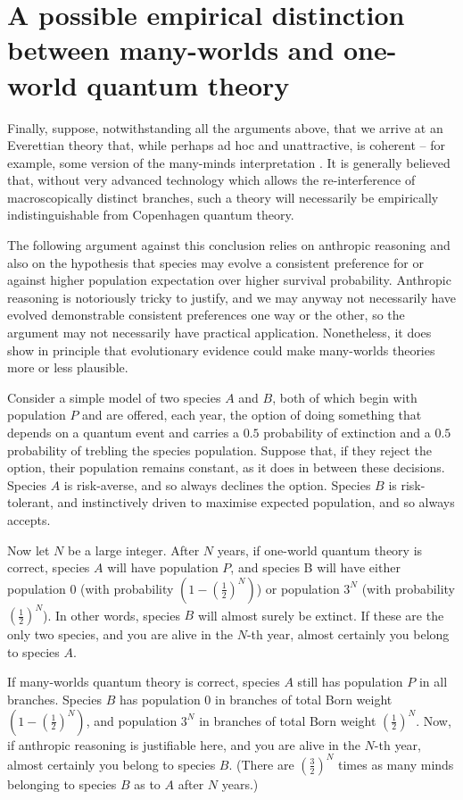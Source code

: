 \documentclass[aps,
pra,epsfig,12pt]{revtex4}
\begin{document}
\section{A possible empirical distinction between many-worlds and one-world
quantum theory}

Finally, suppose, notwithstanding all the arguments above, 
that we arrive at an Everettian theory that, while perhaps 
ad hoc and unattractive, is coherent -- for example, some version of 
the many-minds interpretation \cite{almanyminds}.  
It is generally believed that, without very advanced technology which
allows the re-interference of macroscopically distinct branches, 
such a theory will necessarily be empirically indistinguishable from Copenhagen 
quantum theory.  

The following argument against this conclusion relies on anthropic 
reasoning and also on the hypothesis that species may evolve a  
consistent preference for or against higher population expectation over higher 
survival probability.  Anthropic reasoning is notoriously 
tricky to justify, and we may anyway not necessarily have evolved 
demonstrable consistent preferences one way or the other, so 
the argument may not necessarily have practical application.   
Nonetheless, it does
show in principle that evolutionary evidence could make many-worlds 
theories more or less plausible. 

Consider a simple model of two species $A$ and $B$, both of which begin
with population $P$ and are
offered, each year, the option of doing something that depends on a quantum
event and carries a $0.5$ probability of extinction and a $0.5$ probability 
of trebling the species population.  Suppose that, if they reject
the option, their 
population remains constant,
as it does in between these decisions.  Species $A$ is risk-averse, and so
always declines the option.   Species $B$ is risk-tolerant, and 
instinctively driven to maximise expected population, and so always
accepts.  

Now let $N$ be a large integer.  
After $N$ years, if one-world quantum theory is correct, species $A$ 
will have population $P$, and species B will have either population
$0$ (with probability $ ( 1 - ( \frac{1}{2} )^N )$) or population
$3^N$ (with probability $ ( \frac{1}{2} )^N$).   In other words, species
$B$ will almost surely be extinct.   If these are the only two species,
and you are alive in the $N$-th year, almost certainly you belong to 
species $A$.   

If many-worlds quantum theory is correct, species $A$ still has 
population $P$ in all branches.   Species $B$ has population $0$
in branches of total Born weight $ ( 1 - ( \frac{1}{2} )^N )$, and 
population $3^N$ in branches of total Born weight $ ( \frac{1}{2} )^N$. 
Now, if anthropic reasoning is justifiable here, and you are alive in 
the $N$-th year, almost certainly you belong to species $B$.
(There are $( \frac{3}{2} )^N$ times as many minds belonging to species
$B$ as to $A$ after $N$ years.)  
\end{document}
